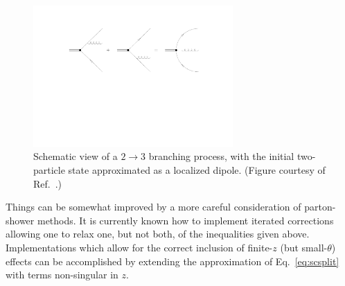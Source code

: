 \begin{figure}[tb!]
	\centering
	\includegraphics[width=0.68\textwidth,trim={5cm 11cm 5cm 3cm},clip]{figures/DS_dipole.pdf}
	\caption{Schematic view of a $2 \to 3$ branching process, with the initial two-particle state approximated as a localized dipole. (Figure courtesy of Ref.~\cite{Ellis:1991qj}.)}
	\label{fig:dipoleant}
\end{figure}

Things can be somewhat improved by a more careful consideration of parton-shower methods. It is currently known how to implement iterated corrections allowing one to relax one, but not both, of the inequalities given above. Implementations which allow for the correct inclusion of finite-$z$ (but small-$\theta$) effects can be accomplished by extending the approximation of Eq.~\eqref{eq:scsplit} with terms non-singular in $z$.

